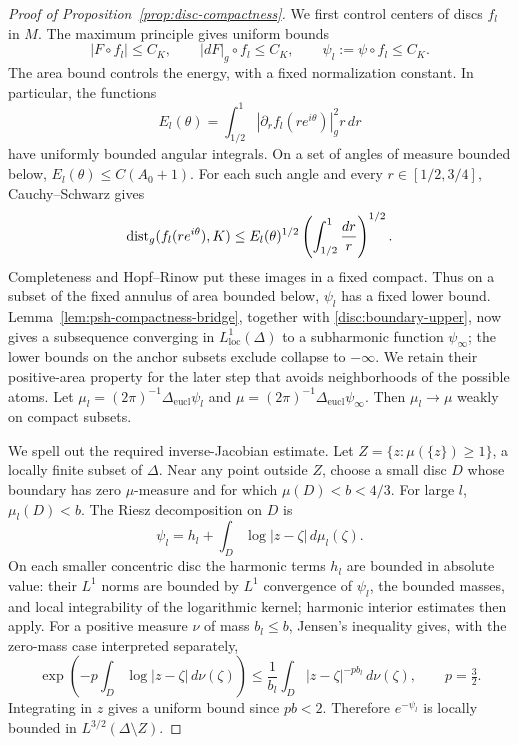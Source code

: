 \begin{proof}[Proof of Proposition~\ref{prop:disc-compactness}]
We first control centers of discs $f_l$ in $M$.  The maximum principle
gives uniform bounds
\begin{equation}\label{disc:boundary-upper}
 |F\circ f_l|\le C_K,\qquad
 |dF|_g\circ f_l\le C_K,\qquad
 \psi_l:=\psi\circ f_l\le C_K.
\end{equation}
The area bound controls the energy, with a fixed normalization
constant.  In particular, the functions
\[
 E_l(\theta)=\int_{1/2}^1
          |\partial_rf_l(re^{i\theta})|_g^2r\,dr
\]
have uniformly bounded angular integrals.  On a set of angles of
measure bounded below, $E_l(\theta)\le C(A_0+1)$.  For each such
angle and every $r\in[1/2,3/4]$, Cauchy--Schwarz gives
\[
 \operatorname{dist}_g(f_l(re^{i\theta}),K)
 \le E_l(\theta)^{1/2}
       \left(\int_{1/2}^1\frac{dr}{r}\right)^{1/2}.
\]
Completeness and Hopf--Rinow put these images in a fixed compact.
Thus on a subset of the fixed annulus of area bounded below,
$\psi_l$ has a fixed lower bound.  Lemma~\ref{lem:psh-compactness-bridge}, together with
\eqref{disc:boundary-upper}, now gives a subsequence converging in
$L^1_{\mathrm{loc}}(\Delta)$ to a subharmonic function
$\psi_\infty$; the lower bounds on the anchor subsets exclude
collapse to $-\infty$.  We retain their positive-area property for
the later step that avoids neighborhoods of the possible atoms.  Let
$\mu_l=(2\pi)^{-1}\Delta_{\mathrm{eucl}}\psi_l$ and
$\mu=(2\pi)^{-1}\Delta_{\mathrm{eucl}}\psi_\infty$.
Then $\mu_l\to\mu$ weakly on compact subsets.

We spell out the required inverse-Jacobian estimate.  Let
$Z=\{z:\mu(\{z\})\ge1\}$, a locally finite subset of $\Delta$.
Near any point outside $Z$, choose a small disc $D$ whose boundary
has zero $\mu$-measure and for which $\mu(D)<b<4/3$.
For large $l$, $\mu_l(D)<b$.  The Riesz decomposition on $D$
\cite[Chapter~I, Proposition~4.22]{DemaillyBook} is
\[
 \psi_l=h_l+\int_D\log|z-\zeta|\,d\mu_l(\zeta).
\]
On each smaller concentric disc the harmonic terms $h_l$ are bounded
in absolute value: their $L^1$ norms are bounded by $L^1$ convergence
of $\psi_l$, the bounded masses, and local integrability of the
logarithmic kernel; harmonic interior estimates then apply.
For a positive measure $\nu$ of mass $b_l\le b$, Jensen's inequality
gives, with the zero-mass case interpreted separately,
\[
 \exp\left(-p\int_D\log|z-\zeta|\,d\nu(\zeta)\right)
 \le\frac1{b_l}\int_D|z-\zeta|^{-pb_l}\,d\nu(\zeta),
 \qquad p=\tfrac32.
\]
Integrating in $z$ gives a uniform bound since $pb<2$.  Therefore
$e^{-\psi_l}$ is locally bounded in $L^{3/2}(\Delta\setminus Z)$.


\end{proof}
